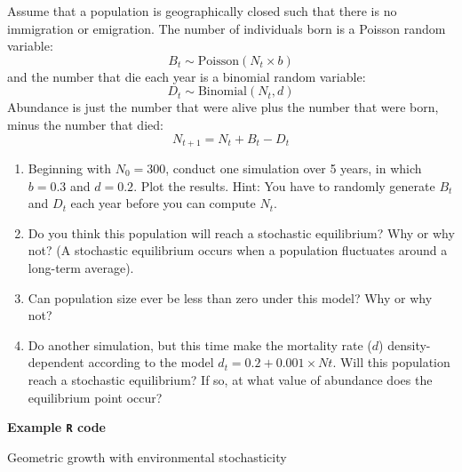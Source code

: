 \documentclass[12pt]{article}\usepackage[]{graphicx}\usepackage[]{color}
\begin{document}
Assume that a population is geographically closed such that there is
no immigration or emigration. The number of individuals born is a
Poisson random variable:
\[
  B_t \sim \mathrm{Poisson}(N_t \times b)
\]
and the number that die each year is a binomial random variable:
\[
  D_t \sim \mathrm{Binomial}(N_t, d)
\]
Abundance is just the number that were alive plus the number that were
born, minus the number that died:
\[
  N_{t+1} = N_t + B_t - D_t
\]
\begin{enumerate}
  \item Beginning with $N_0=300$, conduct one simulation over 5
    years, in which $b=0.3$ and $d=0.2$. Plot the results. Hint: You have
    to randomly generate $B_t$ and $D_t$ each year before you can compute
    $N_t$.
  \item Do you think this population will reach a stochastic
    equilibrium? Why or why not? (A stochastic equilibrium occurs when
    a population fluctuates around a long-term average).
  \item Can population size ever be less than zero under this model?
    Why or why not?
  \item Do another simulation, but this time make the mortality rate
    ($d$) density-dependent according to the model $d_t = 0.2 +
    0.001\times Nt$. Will this population reach a stochastic equilibrium? If
    so, at what value of abundance does the equilibrium point occur?
\end{enumerate}


\newpage

{\bf Example {\tt R} code \\}



Geometric growth with environmental stochasticity
\end{document}
